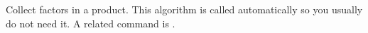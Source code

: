
Collect factors in a product. This algorithm is called automatically
so you usually do not need it. A related command is
.

